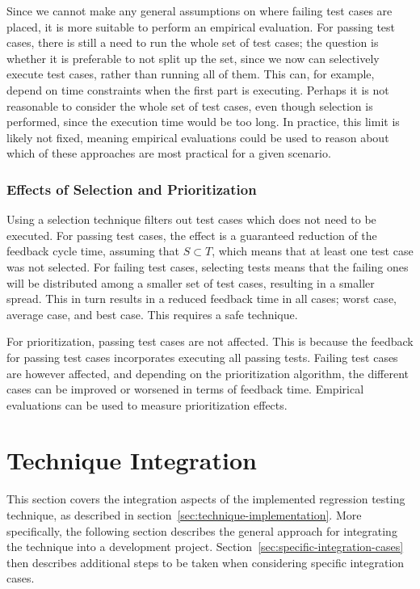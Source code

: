 \documentclass[a4paper,english,12pt]{report}
\begin{document}
Since we cannot make any general assumptions on where failing test cases are placed, it is more suitable to perform an empirical evaluation. For passing test cases, there is still a need to run the whole set of test cases; the question is whether it is preferable to not split up the set, since we now can selectively execute test cases, rather than running all of them. This can, for example, depend on time constraints when the first part is executing. Perhaps it is not reasonable to consider the whole set of test cases, even though selection is performed, since the execution time would be too long. In practice, this limit is likely not fixed, meaning empirical evaluations could be used to reason about which of these approaches are most practical for a given scenario. 

\subsubsection{Effects of Selection and Prioritization}
Using a selection technique filters out test cases which does not need to be executed. 
For passing test cases, the effect is a guaranteed reduction of the feedback cycle time, assuming that $S \subset T$, which means that at least one test case was not selected.
For failing test cases, selecting tests means that the failing ones will be distributed among a smaller set of test cases, resulting in a smaller spread. This in turn results in a reduced feedback time in all cases; worst case, average case, and best case. This requires a safe technique.

For prioritization, passing test cases are not affected. This is because the feedback for passing test cases incorporates executing all passing tests. Failing test cases are however affected, and depending on the prioritization algorithm, the different cases can be improved or worsened in terms of feedback time. Empirical evaluations can be used to measure prioritization effects.

\section{Technique Integration}\label{sec:technique-integration}
This section covers the integration aspects of the implemented regression testing technique, as described in section~\ref{sec:technique-implementation}. More specifically, the following section describes the general approach for integrating the technique into a development project. Section~\ref{sec:specific-integration-cases} then describes additional steps to be taken when considering specific integration cases.
\end{document}
